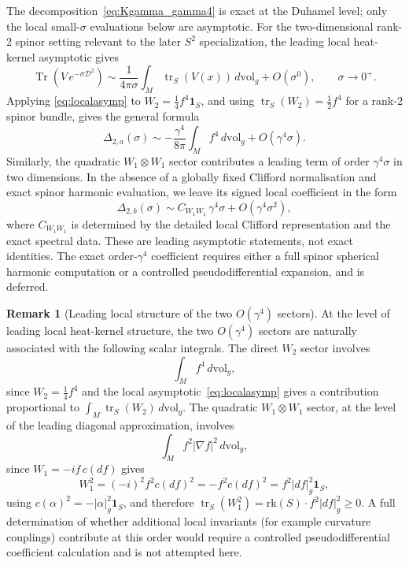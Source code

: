 \documentclass[11pt,a4paper]{article}
\numberwithin{equation}{section}
\theoremstyle{definition}
\newtheorem{Remark}[Theorem]{Remark}
\newcommand{\cD}{\mathcal{D}}
\newcommand{\Tr}{\operatorname{Tr}}
\newcommand{\tr}{\operatorname{tr}}
\begin{document}
The decomposition~\eqref{eq:Kgamma_gamma4} is exact at the Duhamel level;
only the local small-$\sigma$ evaluations below are asymptotic. For the
two-dimensional rank-$2$ spinor setting relevant to the later $S^2$
specialization, the leading local heat-kernel asymptotic gives
\begin{equation}
\Tr(V\,e^{-\sigma \cD^2})\sim \frac{1}{4\pi\sigma}\int_M
\tr_S(V(x))\,d\mathrm{vol}_g + O(\sigma^0),
\qquad \sigma\to 0^+.
\label{eq:localasymp}
\end{equation}
Applying \eqref{eq:localasymp} to $W_2=\tfrac{1}{4}f^4\mathbf{1}_S$,
and using $\tr_S(W_2)=\tfrac{1}{2}f^4$ for a rank-$2$ spinor bundle,
gives the general formula
\begin{equation}
\Delta_{2,a}(\sigma)\sim
-\frac{\gamma^4}{8\pi}\int_M f^4\,d\mathrm{vol}_g
+O(\gamma^4\sigma).
\label{eq:W2leading}
\end{equation}
Similarly, the quadratic $W_1\otimes W_1$ sector contributes a leading
term of order $\gamma^4\sigma$ in two dimensions. In the absence of a
globally fixed Clifford normalisation and exact spinor harmonic evaluation,
we leave its signed local coefficient in the form
\begin{equation}
\Delta_{2,b}(\sigma)\sim C_{W_1W_1}\,\gamma^4\sigma
+O(\gamma^4\sigma^2),
\label{eq:W1W1leading}
\end{equation}
where $C_{W_1W_1}$ is determined by the detailed local Clifford
representation and the exact spectral data. These are leading asymptotic
statements, not exact identities. The exact order-$\gamma^4$ coefficient
requires either a full spinor spherical harmonic computation or a
controlled pseudodifferential expansion, and is deferred.

\begin{Remark}[Leading local structure of the two $O(\gamma^4)$ sectors]
\label{rem:localinvariants}
At the level of leading local heat-kernel structure, the two
$O(\gamma^4)$ sectors are naturally associated with the following scalar
integrals. The direct $W_2$ sector involves
\begin{equation}
\int_M f^4\,d\mathrm{vol}_g,
\end{equation}
since $W_2 = \tfrac{1}{4}f^4$ and the local asymptotic~\eqref{eq:localasymp}
gives a contribution proportional to $\int_M \tr_S(W_2)\,d\mathrm{vol}_g$.
The quadratic $W_1\otimes W_1$ sector, at the level of the leading
diagonal approximation, involves
\begin{equation}
\int_M f^2|\nabla f|^2\,d\mathrm{vol}_g,
\end{equation}
since $W_1 = -if\,c(df)$ gives
\begin{equation}
W_1^2=(-i)^2 f^2 c(df)^2=-f^2 c(df)^2=f^2|df|_g^2\mathbf{1}_S,
\end{equation}
using $c(\alpha)^2=-|\alpha|_g^2\mathbf{1}_S$, and therefore
$\tr_S(W_1^2)=\mathrm{rk}(S)\cdot f^2|df|_g^2\ge 0$.
A full determination of whether additional local invariants
(for example curvature couplings) contribute at this order would require
a controlled pseudodifferential coefficient calculation and is not
attempted here.
\end{Remark}
\end{document}
